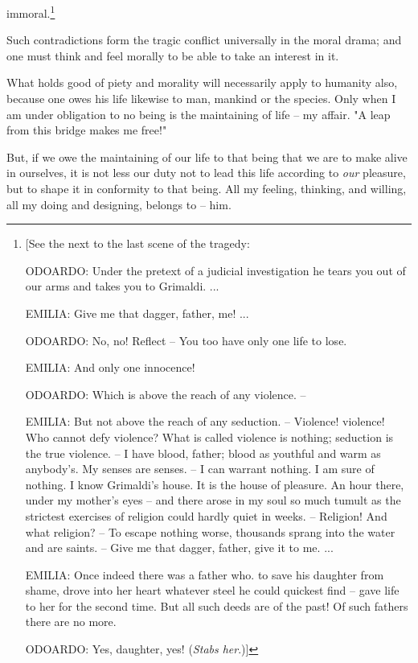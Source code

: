 \documentclass[a4paper]{book}
\begin{document}
immoral.\footnote{[See the next to the last scene of the tragedy:

ODOARDO: Under the pretext of a judicial investigation he tears you out of our 
arms and takes you to Grimaldi. ...

EMILIA: Give me that dagger, father, me! ...

ODOARDO: No, no! Reflect -- You too have only one life to lose.

EMILIA: And only one innocence!

ODOARDO: Which is above the reach of any violence. --

EMILIA: But not above the reach of any seduction. -- Violence! violence! Who 
cannot defy violence? What is called violence is nothing; seduction is the 
true violence. -- I have blood, father; blood as youthful and warm as 
anybody's. My senses are senses. -- I can warrant nothing. I am sure of 
nothing. I know Grimaldi's house. It is the house of pleasure. An hour there, 
under my mother's eyes -- and there arose in my soul so much tumult as the 
strictest exercises of religion could hardly quiet in weeks. -- Religion! And 
what religion? -- To escape nothing worse, thousands sprang into the water and 
are saints. -- Give me that dagger, father, give it to me. ...

EMILIA: Once indeed there was a father who. to save his daughter from shame, 
drove into her heart whatever steel he could quickest find -- gave life to her 
for the second time. But all such deeds are of the past! Of such fathers there 
are no more.

ODOARDO: Yes, daughter, yes! (\textit{Stabs her}.)]

}

Such contradictions form the tragic conflict universally in the moral drama; 
and one must think and feel morally to be able to take an interest in it.

What holds good of piety and morality will necessarily apply to humanity also, 
because one owes his life likewise to man, mankind or the species. Only when I 
am under obligation to no being is the maintaining of life -- my affair. "{}A 
leap from this bridge makes me free!"{}

But, if we owe the maintaining of our life to that being that we are to make 
alive in ourselves, it is not less our duty not to lead this life according to 
\textit{our} pleasure, but to shape it in conformity to that being. All my 
feeling, thinking, and willing, all my doing and designing, belongs to -- him.
\end{document}
